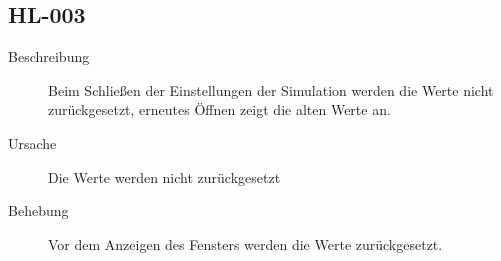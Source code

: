 \documentclass[parskip=full]{scrartcl}
\begin{document}
\subsection{HL-003}
\begin{description}
	\item[Beschreibung] Beim Schließen der Einstellungen der Simulation werden die Werte nicht zurückgesetzt, erneutes Öffnen zeigt die alten Werte an.
	\item[Ursache] Die Werte werden nicht zurückgesetzt
	\item[Behebung] Vor dem Anzeigen des Fensters werden die Werte zurückgesetzt.
\end{description}

\pagebreak
{}
{}
\listoffigures
\end{document}
